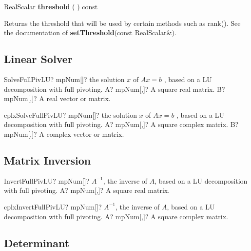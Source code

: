 \vspace{0.3cm}
RealScalar \textbf{threshold}  ( )  const 

Returns the threshold that will be used by certain methods such as rank().
See the documentation of \textbf{setThreshold}(const RealScalar\&). 



\subsection{Linear Solver}


\begin{mpFunctionsExtract}
	\mpFunctionTwo
	{SolveFullPivLU? mpNum[]? the solution $x$ of $A x = b$ , based on a LU decomposition with full pivoting.}
	{A? mpNum[,]? A square real matrix.}
	{B? mpNum[,]? A real vector or matrix.}
\end{mpFunctionsExtract}


\vspace{0.6cm}
\begin{mpFunctionsExtract}
	\mpFunctionTwo
	{cplxSolveFullPivLU? mpNum[]? the solution $x$ of $A x = b$ , based on a LU decomposition with full pivoting.}
	{A? mpNum[,]? A square complex matrix.}
	{B? mpNum[,]? A complex vector or matrix.}
\end{mpFunctionsExtract}




\subsection{Matrix Inversion}


\begin{mpFunctionsExtract}
	\mpFunctionOne
	{InvertFullPivLU? mpNum[]? $A^{-1}$, the inverse of $A$, based on a LU decomposition with full pivoting.}
	{A? mpNum[,]? A square real matrix.}
\end{mpFunctionsExtract}

\vspace{0.6cm}
\begin{mpFunctionsExtract}
	\mpFunctionOne
	{cplxInvertFullPivLU? mpNum[]? $A^{-1}$, the inverse of $A$, based on a LU decomposition with full pivoting.}
	{A? mpNum[,]? A square complex matrix.}
\end{mpFunctionsExtract}




\subsection{Determinant}


